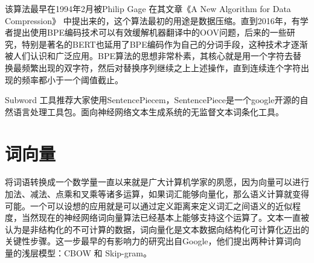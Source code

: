 \documentclass[twoside,a4paper,12pt]{book}%
\begin{document}
该算法最早在1994年2月被Philip Gage 在其文章《A New Algorithm for Data Compression》 中提出来的，这个算法最初的用途是数据压缩。直到2016年，有学者提出使用\gls{BPE}编码技术可以有效缓解机器翻译中的OOV问题，后来的一些研究，特别是著名的\gls{BERT}也延用了\gls{BPE}编码作为自己的分词手段，这种技术才逐渐被人们认识和广泛应用。\gls{BPE}算法的思想非常朴素，其核心就是用一个字符去替换最频繁出现的双字符，然后对替换序列继续之上上述操作，直到连续连个字符出现的频率都小于一个阈值截止。

Subword 工具推荐大家使用SentencePiecem，SentencePiece是一个google开源的自然语言处理工具包。面向神经网络文本生成系统的无监督文本词条化工具。

\section{词向量}

将词语转换成一个数学量一直以来就是广大计算机学家的夙愿，因为向量可以进行加法、减法、点乘和叉乘等诸多运算，如果词汇能够向量化，那么语义计算就变得可能。一个可以设想的应用就是可以通过定义距离来定义词汇之间语义的近似程度，当然现在的神经网络词向量算法已经基本上能够支持这个运算了。文本一直被认为是非结构化的不可计算的数据，词向量化是文本数据向结构化可计算化迈出的关键性步骤。这一步最早的有影响力的研究出自Google，他们提出两种计算词向量的浅层模型：\gls{CBOW} 和 Skip-gram。
\end{document}
